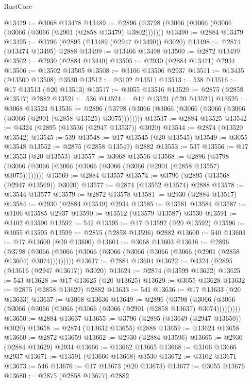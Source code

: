 \begin{lexlean}{RustCore}
\begin{coremodule}
@13479 := @3068 @13478
@13489 := @2896 (@3798 (@3066 (@3066 (@3066 (@3066 (@3066 (@2901 (@2858 @13479) @3802)))))))
@13490 := @2884 @13479
@13495 := @3796 (@2895 (@13489 (@2947 @13490)) @3020)
@13498 := @2874 (@13474 @13495) @2888
@13499 := @13466 @13498
@13500 := @2872 @13499
@13502 := @2930 (@2884 @13440)
@13505 := @2930 (@2884 @13471) @2934
@13506 := @13502 @13505
@13508 := @3106 @13506 @2937
@13511 := @13435 (@13500 @13508) @3530
@13512 := @3102 @13511
@13513 := 538
@13516 := @17 @13513 (@20 @13513)
@13517 := @3055 @13516
@13520 := @2875 (@2858 @13517) @2882
@13521 := 536
@13524 := @17 @13521 (@20 @13521)
@13525 := @3068 @13524
@13536 := @2896 (@3798 (@3066 (@3066 (@3066 (@3066 (@3066 (@3066 (@2901 (@2858 @13525) @3075))))))))
@13537 := @2884 @13525
@13542 := @4324 (@2895 (@13536 (@2947 @13537)) @3020)
@13544 := @2874 (@13520 @13542)
@13545 := 539
@13548 := @17 @13545 (@20 @13545)
@13549 := @3055 @13548
@13552 := @2875 (@2858 @13549) @2882
@13553 := 537
@13556 := @17 @13553 (@20 @13553)
@13557 := @3068 @13556
@13568 := @2896 (@3798 (@3066 (@3066 (@3066 (@3066 (@3066 (@3066 (@2901 (@2858 @13557) @3075))))))))
@13569 := @2884 @13557
@13574 := @3796 (@2895 (@13568 (@2947 @13569)) @3020)
@13577 := @2874 (@13552 @13574) @2888
@13578 := @13544 @13577
@13579 := @2872 @13578
@13581 := @2930 (@2884 @13517)
@13584 := @2930 (@2884 @13549) @2934
@13585 := @13581 @13584
@13587 := @3106 @13585 @2937
@13590 := @13512 (@13579 @13587) @3530
@13591 := @3102 @13590
@13592 := 542
@13595 := @17 @13592 (@20 @13592)
@13596 := @3055 @13595
@13599 := @2875 (@2858 @13596) @2882
@13600 := 540
@13603 := @17 @13600 (@20 @13600)
@13604 := @3068 @13603
@13616 := @2896
    (@3798 (@3066 (@3066 (@3066 (@3066 (@3066 (@3066 (@3066 (@2901 (@2858 @13604) @3074)))))))))
@13617 := @2884 @13604
@13622 := @4324 (@2895 (@13616 (@2947 @13617)) @3020)
@13624 := @2874 (@13599 @13622)
@13625 := 543
@13628 := @17 @13625 (@20 @13625)
@13629 := @3055 @13628
@13632 := @2875 (@2858 @13629) @2882
@13633 := 541
@13636 := @17 @13633 (@20 @13633)
@13637 := @3068 @13636
@13649 := @2896
    (@3798 (@3066 (@3066 (@3066 (@3066 (@3066 (@3066 (@3066 (@2901 (@2858 @13637) @3074)))))))))
@13650 := @2884 @13637
@13655 := @3796 (@2895 (@13649 (@2947 @13650)) @3020)
@13658 := @2874 (@13632 @13655) @2888
@13659 := @13624 @13658
@13660 := @2872 @13659
@13662 := @2930 (@2884 @13596)
@13665 := @2930 (@2884 @13629) @2934
@13666 := @13662 @13665
@13668 := @3106 @13666 @2937
@13671 := @13591 (@13660 @13668) @3530
@13672 := @3102 @13671
@13673 := 546
@13676 := @17 @13673 (@20 @13673)
@13677 := @3055 @13676
@13680 := @2875 (@2858 @13677) @2882

\end{coremodule}
\end{lexlean}

